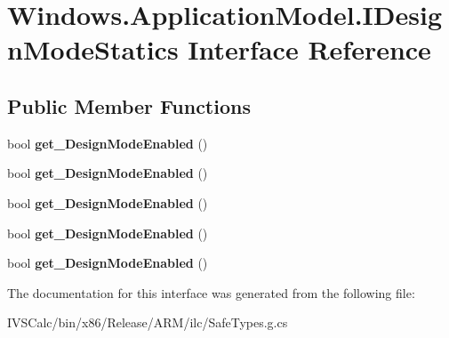 \hypertarget{interface_windows_1_1_application_model_1_1_i_design_mode_statics}{}\section{Windows.\+Application\+Model.\+I\+Design\+Mode\+Statics Interface Reference}
\label{interface_windows_1_1_application_model_1_1_i_design_mode_statics}
\subsection*{Public Member Functions}
\begin{DoxyCompactItemize}
\item 
\mbox{\label{interface_windows_1_1_application_model_1_1_i_design_mode_statics_ab375f321a70c9155201cb6e3b5cd2c8d}} 
bool {\bfseries get\+\_\+\+Design\+Mode\+Enabled} ()
\item 
\mbox{\label{interface_windows_1_1_application_model_1_1_i_design_mode_statics_ab375f321a70c9155201cb6e3b5cd2c8d}} 
bool {\bfseries get\+\_\+\+Design\+Mode\+Enabled} ()
\item 
\mbox{\label{interface_windows_1_1_application_model_1_1_i_design_mode_statics_ab375f321a70c9155201cb6e3b5cd2c8d}} 
bool {\bfseries get\+\_\+\+Design\+Mode\+Enabled} ()
\item 
\mbox{\label{interface_windows_1_1_application_model_1_1_i_design_mode_statics_ab375f321a70c9155201cb6e3b5cd2c8d}} 
bool {\bfseries get\+\_\+\+Design\+Mode\+Enabled} ()
\item 
\mbox{\label{interface_windows_1_1_application_model_1_1_i_design_mode_statics_ab375f321a70c9155201cb6e3b5cd2c8d}} 
bool {\bfseries get\+\_\+\+Design\+Mode\+Enabled} ()
\end{DoxyCompactItemize}


The documentation for this interface was generated from the following file\+:\begin{DoxyCompactItemize}
\item 
I\+V\+S\+Calc/bin/x86/\+Release/\+A\+R\+M/ilc/Safe\+Types.\+g.\+cs\end{DoxyCompactItemize}
